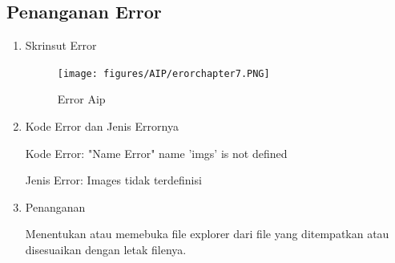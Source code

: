 \begin{enumerate}
\subsection{Penanganan Error}
\begin{enumerate}

\item Skrinsut Error
\begin{figure}[ht]
\centering
\texttt{[image: figures/AIP/erorchapter7.PNG]}
\caption{ Error Aip}
\label{eror}
\end{figure}
\item Kode Error dan Jenis Errornya
\par Kode Error: "Name Error" name 'imgs'  is not defined
\par Jenis Error: Images tidak terdefinisi
\item Penanganan
\par Menentukan atau memebuka file explorer dari file yang ditempatkan atau disesuaikan dengan letak filenya.

\end{enumerate}
\end{enumerate}